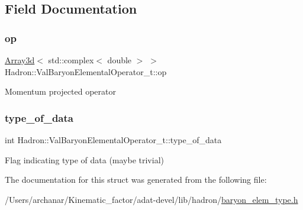 \subsection{Field Documentation}
\mbox{\label{structHadron_1_1ValBaryonElementalOperator__t_aeb438473276ebd527b1d6a1c72d0630d}} 
\subsubsection{\texorpdfstring{op}{op}}
{\footnotesize\ttfamily \mbox{\hyperlink{classXMLArray_1_1Array3d}{Array3d}}$<$ std\+::complex$<$ double $>$ $>$ Hadron\+::\+Val\+Baryon\+Elemental\+Operator\+\_\+t\+::op}

Momentum projected operator \mbox{\label{structHadron_1_1ValBaryonElementalOperator__t_acd2ecc17e571292524c3fc8a1eedc605}} 
\subsubsection{\texorpdfstring{type\_of\_data}{type\_of\_data}}
{\footnotesize\ttfamily int Hadron\+::\+Val\+Baryon\+Elemental\+Operator\+\_\+t\+::type\+\_\+of\+\_\+data}

Flag indicating type of data (maybe trivial) 

The documentation for this struct was generated from the following file\+:\begin{DoxyCompactItemize}
\item 
/\+Users/archanar/\+Kinematic\+\_\+factor/adat-\/devel/lib/hadron/\mbox{\hyperlink{adat-devel_2lib_2hadron_2baryon__elem__type_8h}{baryon\+\_\+elem\+\_\+type.\+h}}\end{DoxyCompactItemize}

